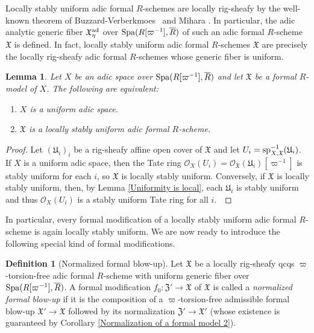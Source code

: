 \documentclass[12pt,twoside,a4paper]{article}
\newtheorem{lemma}[thm]{Lemma}
\theoremstyle{definition}
\newtheorem{mydef}[thm]{Definition}
\theoremstyle{remark}
\newcommand\ad{{\rm ad}}
\newcommand\spc{{\rm sp}}
\newcommand\Spa{{\rm Spa}}
\begin{document}
Locally stably uniform adic formal $R$-schemes are locally rig-sheafy by the well-known theorem of Buzzard-Verberkmoes \cite{BV} and Mihara \cite{Mihara}. In particular, the adic analytic generic fiber $\mathfrak{X}_{\eta}^{\ad}$ over $\Spa(R[\varpi^{-1}], \overline{R})$ of such an adic formal $R$-scheme $\mathfrak{X}$ is defined. In fact, locally stably uniform adic formal $R$-schemes $\mathfrak{X}$ are precisely the locally rig-sheafy adic formal $R$-schemes whose generic fiber is uniform.
\begin{lemma}\label{Uniform generic fiber}Let $X$ be an adic space over $\Spa(R[\varpi^{-1}], \overline{R})$ and let $\mathfrak{X}$ be a formal $R$-model of $X$. The following are equivalent: \begin{enumerate}[(1)] \item $X$ is a uniform adic space. \item $\mathfrak{X}$ is a locally stably uniform adic formal $R$-scheme.\end{enumerate}\end{lemma}
\begin{proof}Let $(\mathfrak{U}_{i})_{i}$ be a rig-sheafy affine open cover of $\mathfrak{X}$ and let $U_{i}=\spc_{X,\mathfrak{X}}^{-1}(\mathfrak{U}_{i})$. If $X$ is a uniform adic space, then the Tate ring $\mathcal{O}_{X}(U_{i})=\mathcal{O}_{\mathfrak{X}}(\mathfrak{U}_{i})[\varpi^{-1}]$ is stably uniform for each $i$, so $\mathfrak{X}$ is locally stably uniform. Conversely, if $\mathfrak{X}$ is locally stably uniform, then, by Lemma \ref{Uniformity is local}, each $\mathfrak{U}_{i}$ is stably uniform and thus $\mathcal{O}_{X}(U_{i})$ is a stably uniform Tate ring for all $i$. \end{proof}
In particular, every formal modification of a locally stably uniform adic formal $R$-scheme is again locally stably uniform. We are now ready to introduce the following special kind of formal modifications.
\begin{mydef}[Normalized formal blow-up]\label{Normalized formal blow-up}Let $\mathfrak{X}$ be a locally rig-sheafy qcqs $\varpi$-torsion-free adic formal $R$-scheme with uniform generic fiber over $\Spa(R[\varpi^{-1}], \overline{R})$. A formal modification $f_{0}: \mathfrak{Z}'\to\mathfrak{X}$ of $\mathfrak{X}$ is called a \textit{normalized formal blow-up} if it is the composition of a $\varpi$-torsion-free admissible formal blow-up $\mathfrak{X}'\to\mathfrak{X}$ followed by its normalization $\mathfrak{Z}'\to\mathfrak{X}'$ (whose existence is guaranteed by Corollary \ref{Normalization of a formal model 2}).\end{mydef}
\end{document}
